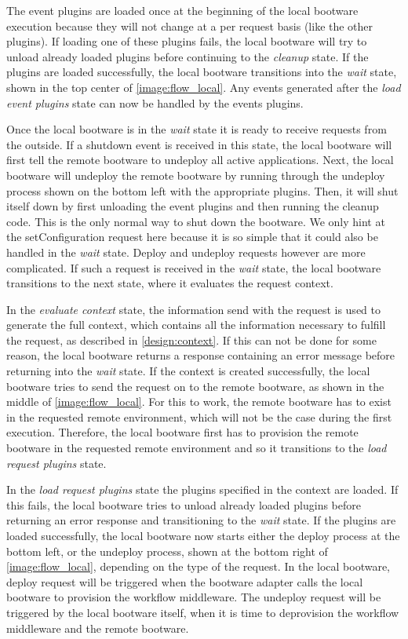 The event plugins are loaded once at the beginning of the local bootware execution because they will not change at a per request basis (like the other plugins).
If loading one of these plugins fails, the local bootware will try to unload already loaded plugins before continuing to the \textit{cleanup} state.
If the plugins are loaded successfully, the local bootware transitions into the \textit{wait} state, shown in the top center of \autoref{image:flow_local}.
Any events generated after the \textit{load event plugins} state can now be handled by the events plugins.

Once the local bootware is in the \textit{wait} state it is ready to receive requests from the outside.
If a shutdown event is received in this state, the local bootware will first tell the remote bootware to undeploy all active applications.
Next, the local bootware will undeploy the remote bootware by running through the undeploy process shown on the bottom left with the appropriate plugins.
Then, it will shut itself down by first unloading the event plugins and then running the cleanup code.
This is the only normal way to shut down the bootware.
We only hint at the setConfiguration request here because it is so simple that it could also be handled in the \textit{wait} state.
Deploy and undeploy requests however are more complicated.
If such a request is received in the \textit{wait} state, the local bootware transitions to the next state, where it evaluates the request context.

In the \textit{evaluate context} state, the information send with the request is used to generate the full context, which contains all the information necessary to fulfill the request, as described in \autoref{design:context}.
If this can not be done for some reason, the local bootware returns a response containing an error message before returning into the \textit{wait} state.
If the context is created successfully, the local bootware tries to send the request on to the remote bootware, as shown in the middle of \autoref{image:flow_local}.
For this to work, the remote bootware has to exist in the requested remote environment, which will not be the case during the first execution.
Therefore, the local bootware first has to provision the remote bootware in the requested remote environment and so it transitions to the \textit{load request plugins} state.

In the \textit{load request plugins} state the plugins specified in the context are loaded.
If this fails, the local bootware tries to unload already loaded plugins before returning an error response and transitioning to the \textit{wait} state.
If the plugins are loaded successfully, the local bootware now starts either the deploy process at the bottom left, or the undeploy process, shown at the bottom right of \autoref{image:flow_local}, depending on the type of the request.
In the local bootware, deploy request will be triggered when the bootware adapter calls the local bootware to provision the workflow middleware.
The undeploy request will be triggered by the local bootware itself, when it is time to deprovision the workflow middleware and the remote bootware.

